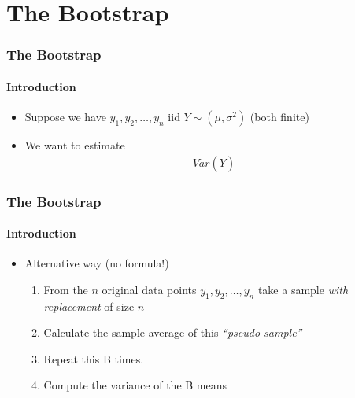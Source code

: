 \documentclass[
  shownotes,
  xcolor={svgnames},
  hyperref={colorlinks,citecolor=DarkBlue,linkcolor=andesred,urlcolor=DarkBlue}
  , aspectratio=169]{beamer}
\begin{document}
\section{The Bootstrap}
\begin{frame}[fragile]
\frametitle{The Bootstrap}
\framesubtitle{Introduction}

\begin{itemize}
  \item Suppose we have $y_1,y_2,\dots,y_n$ iid $Y\sim(\mu,\sigma^2)$ (both finite)
  \medskip
  \item We want to estimate 
  \begin{align}
    Var(\bar{Y})
  \end{align}

\end{itemize}


 \end{frame}
\begin{frame}[fragile]
\frametitle{The Bootstrap}
\framesubtitle{Introduction}
\begin{itemize}
  \item Alternative way (no formula!)
  \medskip
  \begin{enumerate}
    \item From the $n$ original data points $y_1,y_2,\dots,y_n$ take a sample {\it with replacement} of size $n$
    \medskip
    \item Calculate the sample average of this {\it ``pseudo-sample''}
    \medskip
    \item Repeat this B times.
    \medskip
    \item Compute the variance of the B means
  
  \end{enumerate}

\end{itemize}

 
 \end{frame}
\end{document}

